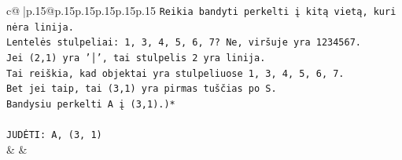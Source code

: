 \documentclass{article}
\begin{document}
{\begin{supertabular}{c@{$\;$}|p{.15\linewidth}@{}p{.15\linewidth}p{.15\linewidth}p{.15\linewidth}p{.15\linewidth}p{.15\linewidth}}
{{{\texttt{Reikia bandyti perkelti į kitą vietą, kuri nėra linija. } \\
\texttt{Lentelės stulpeliai: 1, 3, 4, 5, 6, 7? Ne, viršuje yra 1234567. } \\
\texttt{Jei (2,1) yra '│', tai stulpelis 2 yra linija. } \\
\texttt{Tai reiškia, kad objektai yra stulpeliuose 1, 3, 4, 5, 6, 7. } \\
\texttt{Bet jei taip, tai (3,1) yra pirmas tuščias po S. } \\
\texttt{Bandysiu perkelti A į (3,1).)*} \\
\\ 
\texttt{JUDĖTI: A, (3, 1)} \\
            }
        }
    }
    & & \\ \\


\end{supertabular}}
\end{document}
